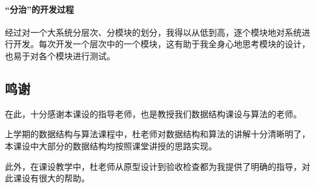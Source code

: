 \documentclass[scheme = chinese]{ctexart}
\begin{document}
\paragraph{“分治”的开发过程} 经过对一个大系统分层次、分模块的划分，我得以从低到高，逐个模块地对系统进行开发。每次开发一个层次中的一个模块，这有助于我全身心地思考模块的设计，也易于对各个模块进行测试。

\subsection{鸣谢}
在此，十分感谢本课设的指导老师，也是教授我们数据结构课设与算法的老师。

上学期的数据结构与算法课程中，杜老师对数据结构和算法的讲解十分清晰明了，本课设中大部分的数据结构均按照课堂讲授的思路实现。

此外，在课设教学中，杜老师从原型设计到验收检查都为我提供了明确的指导，对此课设有很大的帮助。
\end{document}
